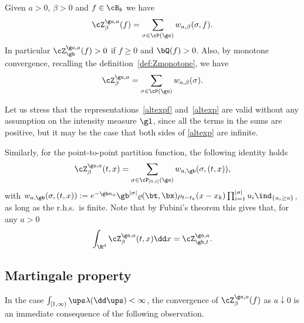 \begin{lemma}\label{eazy}
Given $a>0$, $\beta>0$ and $f\in \cB_b$ we have
\begin{equation}\label{altexpf}
\cZ^{\go,a}_{\beta} (f) = \sum_{\sigma \in \cP(\go)} w_{a,\beta}(\sigma,f).
\end{equation}
In particular $\cZ_{\gb}^{\go,a}(f) > 0$ if $f\ge 0$ and $\bQ(f)>0$.
Also, by monotone convergence, recalling the definition~\eqref{def:Zmonotone}, we have
\begin{equation}\label{altexp}
\cZ^{\go,a}_{\beta}= \sum_{\sigma \in \cP(\go)} w_{a,\beta}(\sigma).
\end{equation}
\end{lemma}

Let us stress that the representations~\eqref{altexpf}
and~\eqref{altexp} are valid without any assumption
on the intensity measure $\gl$,
since all the terms in the sums are positive, but it may be the case that both sides of \eqref{altexp} are infinite.

\begin{rem}
Similarly, for the point-to-point partition function, the following identity holds
\begin{equation}
\label{altexpp2p}
\cZ^{\go,a}_{\beta}(t,x) = \sum_{\sigma \in \cP_{[0,t]}(\go)}
w_{a,\gb}(\sigma, (t,x)),
\end{equation}
with
$w_{a,\gb}(\sigma,(t,x)) := e^{-\gb\kappa_a} \gb^{|\sigma|} \varrho(\bt,\bx) \rho_{t-t_k}(x-x_k) \prod_{i=1}^{|\sigma|} u_i \ind_{\{u_i\geq a\}}$,
as long as the r.h.s.\ is finite.
Note that by Fubini's theorem this gives that, for any $a>0$
\begin{equation}
\label{integreZ}
\int_{\R^d} \cZ^{\go,a}_{\beta}(t,x) \dd x= \cZ_{\gb,t}^{\go,a}.
\end{equation}
\end{rem}

\subsection{Martingale property}

In the case $\int_{[1,\infty)} \ups \lambda(\dd \ups)<\infty$,
the convergence of $\cZ^{\go,a}_{\beta}(f)$ as $a\downarrow 0$ is an immediate consequence of the following observation.

